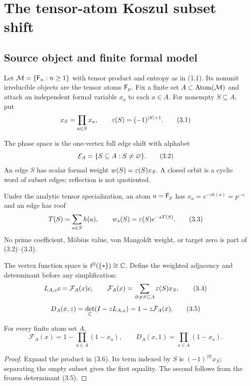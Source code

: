 \section{The tensor-atom Koszul subset shift}
\label{sec:subset-shift}

\subsection{Source object and finite formal model}

Let $\mathcal M=\{\mathsf F_n:n\ge1\}$ with tensor product and entropy as in (1.1).  Its
nonunit irreducible objects are the tensor atoms $\mathsf F_p$.  Fix a finite set
$A\subset\operatorname{Atom}(\mathcal M)$ and attach an independent formal variable
$x_a$ to each $a\in A$.  For nonempty $S\subseteq A$, put
\[
  x_S=\prod_{a\in S}x_a,
  \qquad \varepsilon(S)=(-1)^{|S|+1}.
  \tag{3.1}
\]

\begin{definition}
The phase space is the one-vertex full edge shift with alphabet
\[
  \mathcal E_A=\{S\subseteq A:S\ne\varnothing\}.
  \tag{3.2}
\]
An edge $S$ has scalar formal weight $w(S)=\varepsilon(S)x_S$.  A closed orbit is a
cyclic word of subset edges; reflection is not quotiented.
\end{definition}

Under the analytic tensor specialization, an atom $a=\mathsf F_p$ has
$x_a=e^{-sh(a)}=p^{-s}$ and an edge has roof
\[
  T(S)=\sum_{a\in S}h(a),
  \qquad w_s(S)=\varepsilon(S)e^{-sT(S)}.
  \tag{3.3}
\]
No prime coefficient, M\"obius value, von Mangoldt weight, or target zero is
part of (3.2)--(3.3).

The vertex function space is $\ell^2(\{*\})\cong\mathbb C$.  Define the weighted
adjacency and determinant before any simplification:
\[
  L_{A,x}c=\mathcal F_A(x)c,
  \qquad
  \mathcal F_A(x)=\sum_{\varnothing\ne S\subseteq A}\varepsilon(S)x_S,
  \tag{3.4}
\]
\[
  D_A(x,z)=\det_{\mathbb C}(I-zL_{A,x})=1-z\mathcal F_A(x).
  \tag{3.5}
\]

\begin{theorem}
\label{thm:formal-determinant}
For every finite atom set $A$,
\[
  \mathcal F_A(x)=1-\prod_{a\in A}(1-x_a),
  \qquad
  D_A(x,1)=\prod_{a\in A}(1-x_a).
  \tag{3.6}
\]
\end{theorem}

\begin{proof}
Expand the product in (3.6).  Its term indexed by $S$ is
$(-1)^{|S|}x_S$; separating the empty subset gives the first equality.
The second follows from the frozen determinant (3.5).
\end{proof}

